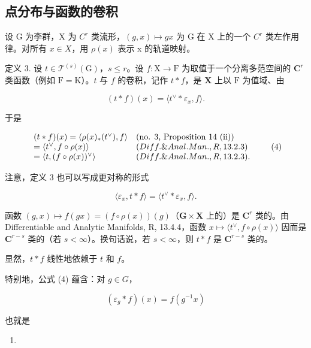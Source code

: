 \subsection{点分布与函数的卷积}

设 G 为李群，X 为 \(C^{r}\) 类流形，\((g, x) \mapsto gx\) 为 G 在 X 上的一个 \(C^{r}\) 类左作用律。对所有 \(x \in X\)，用 \(\rho(x)\) 表示 x 的轨道映射。

定义 3. 设 \(t \in \mathcal{T}^{(s)}(\mathrm{G})\)，\(s \leqslant r\)。设 \(f: \mathrm{X} \to \mathrm{F}\) 为取值于一个分离多范空间的 \(\mathbf{C}^r\) 类函数（例如 \(\mathrm{F} = \mathrm{K}\)）。\(t\) 与 \(f\) 的卷积，记作 \(t * f\)，是 \(\mathbf{X}\) 上以 \(\mathrm{F}\) 为值域、由

\[
(t * f) (x) = \langle t ^ {\vee} * \varepsilon_ {x}, f \rangle .
\]

于是

\[
\begin{array}{l l} (t * f) (x) = \langle \rho (x) _ {*} (t ^ {\vee}), f \rangle & (\text {no. 3, Proposition 14 (ii)}) \\ = \langle t ^ {\vee}, f \circ \rho (x) \rangle & (Diff. \& Anal. Man., R, 13.2.3) \\ = \langle t, (f \circ \rho (x)) ^ {\vee} \rangle & (Diff. \& Anal. Man., R, 13.2.3). \end{array}\tag{4}
\]

注意，定义 3 也可以写成更对称的形式

\[
\langle \varepsilon_ {x}, t * f \rangle = \langle t ^ {\vee} * \varepsilon_ {x}, f \rangle .\tag{5}
\]

函数 \((g,x)\mapsto f(gx) = (f\circ \rho (x))(g)\)（\(\mathbf{G}\times \mathbf{X}\) 上的）是 \(\mathbf{C}^r\) 类的。由 Differentiable and Analytic Manifolds, R, 13.4.4，函数 \(x\mapsto \langle t^\vee,f\circ \rho (x)\rangle\) 因而是 \(\mathbf{C}^{r - s}\) 类的（若 \(s < \infty\)）。换句话说，若 \(s < \infty\)，则 \(t*f\) 是 \(\mathbf{C}^{r - s}\) 类的。

显然，\(t * f\) 线性地依赖于 \(t\) 和 \(f\)。

特别地，公式 (4) 蕴含：对 \(g \in G\)，

\[
\left(\varepsilon_ {g} * f\right) (x) = f \left(g ^ {- 1} x\right)\tag{6}
\]

也就是

\begin{enumerate}
\def\labelenumi{(\arabic{enumi})}
\setcounter{enumi}{6}
\tightlist
\item
\end{enumerate}

